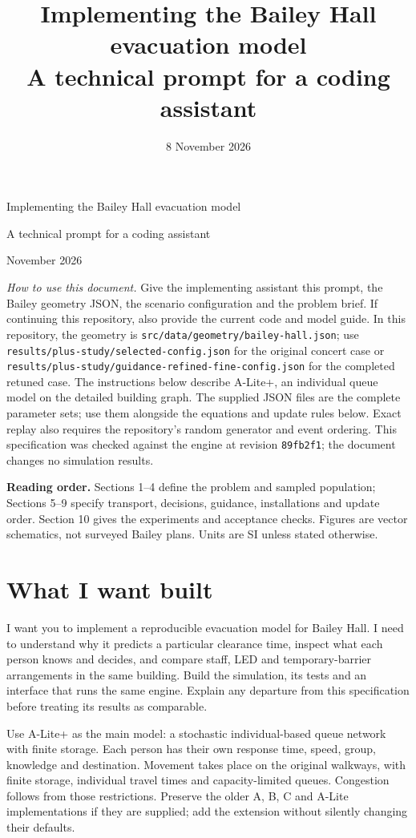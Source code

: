 \documentclass[11pt,a4paper]{article}
\title{Implementing the Bailey Hall evacuation model\\\large A technical prompt for a coding assistant}
\author{}
\date{8 November 2026}
\newcommand{\code}[1]{{\small\nolinkurl{#1}}}
\begin{document}
\begin{center}
{\LARGE Implementing the Bailey Hall evacuation model}\par
\medskip
{\large A technical prompt for a coding assistant}\par
{} November 2026
\end{center}
\vspace{2mm}

\textit{How to use this document.} Give the implementing assistant this prompt, the Bailey geometry JSON, the scenario configuration and the problem brief. If continuing this repository, also provide the current code and model guide. In this repository, the geometry is \code{src/data/geometry/bailey-hall.json}; use \code{results/plus-study/selected-config.json} for the original concert case or \code{results/plus-study/guidance-refined-fine-config.json} for the completed retuned case. The instructions below describe A-Lite+, an individual queue model on the detailed building graph. The supplied JSON files are the complete parameter sets; use them alongside the equations and update rules below. Exact replay also requires the repository's random generator and event ordering. This specification was checked against the engine at revision \code{89fb2f1}; the document changes no simulation results.

\textbf{Reading order.} Sections 1--4 define the problem and sampled population; Sections 5--9 specify transport, decisions, guidance, installations and update order. Section 10 gives the experiments and acceptance checks. Figures are vector schematics, not surveyed Bailey plans. Units are SI unless stated otherwise.

\section{What I want built}

I want you to implement a reproducible evacuation model for Bailey Hall. I need to understand why it predicts a particular clearance time, inspect what each person knows and decides, and compare staff, LED and temporary-barrier arrangements in the same building. Build the simulation, its tests and an interface that runs the same engine. Explain any departure from this specification before treating its results as comparable.

Use A-Lite+ as the main model: a stochastic individual-based queue network with finite storage. Each person has their own response time, speed, group, knowledge and destination. Movement takes place on the original walkways, with finite storage, individual travel times and capacity-limited queues. Congestion follows from those restrictions. Preserve the older A, B, C and A-Lite implementations if they are supplied; add the extension without silently changing their defaults.
\end{document}
